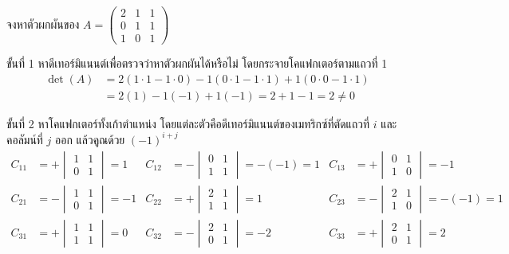 \begin{ex}
\label{ex:inverse-3x3}
จงหาตัวผกผันของ $A = \begin{pmatrix} 2 & 1 & 1 \\ 0 & 1 & 1 \\ 1 & 0 & 1 \end{pmatrix}$
\end{ex}
\begin{solution}
ขั้นที่ 1 หาดีเทอร์มิแนนต์เพื่อตรวจว่าหาตัวผกผันได้หรือไม่ โดยกระจายโคแฟกเตอร์ตามแถวที่ 1
\begin{align*}
\det(A) &= 2(1 \cdot 1 - 1 \cdot 0) - 1(0 \cdot 1 - 1 \cdot 1) + 1(0 \cdot 0 - 1 \cdot 1)\\
        &= 2(1) - 1(-1) + 1(-1) = 2 + 1 - 1 = 2 \neq 0
\end{align*}

ขั้นที่ 2 หาโคแฟกเตอร์ทั้งเก้าตำแหน่ง โดยแต่ละตัวคือดีเทอร์มิแนนต์ของเมทริกซ์ที่ตัดแถวที่ $i$ และคอลัมน์ที่ $j$ ออก แล้วคูณด้วย $(-1)^{i+j}$
\begin{align*}
C_{11} &= +\begin{vmatrix} 1 & 1 \\ 0 & 1 \end{vmatrix} = 1  &  C_{12} &= -\begin{vmatrix} 0 & 1 \\ 1 & 1 \end{vmatrix} = -(-1) = 1  &  C_{13} &= +\begin{vmatrix} 0 & 1 \\ 1 & 0 \end{vmatrix} = -1\\[0.4em]
C_{21} &= -\begin{vmatrix} 1 & 1 \\ 0 & 1 \end{vmatrix} = -1  &  C_{22} &= +\begin{vmatrix} 2 & 1 \\ 1 & 1 \end{vmatrix} = 1  &  C_{23} &= -\begin{vmatrix} 2 & 1 \\ 1 & 0 \end{vmatrix} = -(-1) = 1\\[0.4em]
C_{31} &= +\begin{vmatrix} 1 & 1 \\ 1 & 1 \end{vmatrix} = 0  &  C_{32} &= -\begin{vmatrix} 2 & 1 \\ 0 & 1 \end{vmatrix} = -2  &  C_{33} &= +\begin{vmatrix} 2 & 1 \\ 0 & 1 \end{vmatrix} = 2
\end{align*}


\end{solution}
